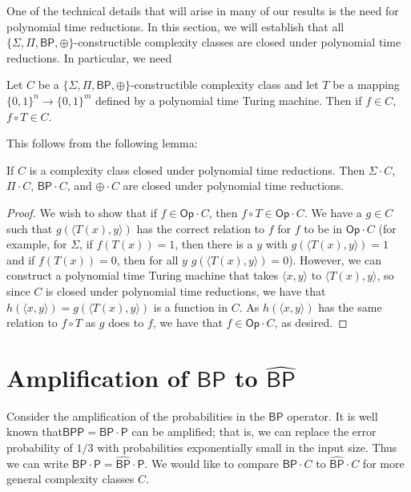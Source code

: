 \documentclass[11pt]{article}
\newcommand{\bp}{\textsf{BP}}
\newcommand{\strongbp}{\widehat{\textsf{BP}}}
\newcommand{\bpp}{\textsf{BPP}}
\newcommand{\parity}{\oplus}
\newcommand{\p}{\textsf{P}}
\newcommand{\op}{\textsf{Op}}
\begin{document}
One of the technical details that will arise in many of our results is the need for polynomial time reductions. In this section, we will establish that all $\{\Sigma,\Pi,\bp,\parity\}$-constructible complexity classes are closed under polynomial time reductions. In particular, we need

\begin{prop}
Let $C$ be a $\{\Sigma,\Pi,\bp,\parity\}$-constructible complexity class and let $T$ be a mapping $\{0,1\}^n \to \{0,1\}^m$ defined by a polynomial time Turing machine. Then if $f \in C$, $f\circ T \in C$.
\end{prop}

This follows from the following lemma:

\begin{lemma}
If $C$ is a complexity class closed under polynomial time reductions. Then $\Sigma \cdot C$, $\Pi\cdot C$, $\bp\cdot C$, and $\parity\cdot C$ are closed under polynomial time reductions.
\end{lemma}
\begin{proof}
We wish to show that if $f \in \op \cdot C$, then $f \circ T \in \op \cdot C$. We have a $g \in C$ such that $g(\langle T(x), y\rangle)$ has the correct relation to $f$ for $f$ to be in $\op \cdot C$ (for example, for $\Sigma$, if $f(T(x)) = 1$, then there is a $y$ with $g(\langle T(x), y\rangle) = 1$ and if $f(T(x)) = 0$, then for all $y$ $g(\langle T(x), y \rangle) = 0$). However, we can construct a polynomial time Turing machine that takes $\langle x, y\rangle$ to $\langle T(x), y\rangle$, so since $C$ is closed under polynomial time reductions, we have that $h(\langle x,y\rangle) = g(\langle T(x),y\rangle)$ is a function in $C$. As $h(\langle x,y\rangle)$ has the same relation to $f \circ T$ as $g$ does to $f$, we have that $f \in \op \cdot C$, as desired.
\end{proof}

\section{Amplification of $\bp$ to $\strongbp$\label{amplifysection}}

Consider the amplification of the probabilities in the $\bp$ operator. It is well known that\linebreak $\bpp = \bp \cdot \p$ can be amplified; that is, we can replace the error probability of $1/3$ with probabilities exponentially small in the input size. Thus we can write $\bp \cdot \p = \strongbp \cdot \p$. We would like to compare $\bp \cdot C$ to $\strongbp \cdot C$ for more general complexity classes $C$.
\end{document}
